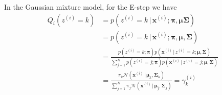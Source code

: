\documentclass[final,3p,times,twocolumn]{elsarticle}
\begin{document}
In the Gaussian mixture model, for the E-step we have
\begin{equation}
\label{eqn:gmmE}
\begin{split}
Q_i(z^{(i)} = k) &= p(z^{(i)} = k\,|\,\boldsymbol x^{(i)}; \boldsymbol \pi, \boldsymbol \mu \boldsymbol \Sigma)\\
&= p(z^{(i)}=k\,|\,\boldsymbol x^{(i)}; \boldsymbol \pi, \boldsymbol \mu, \boldsymbol \Sigma)\\
&= \frac{p(z^{(i)}=k;\boldsymbol \pi)p(\boldsymbol x^{(i)}\,|\,z^{(i)}=k;\boldsymbol \mu, \boldsymbol \Sigma)}
{\sum_{j=1}^K p(z^{(i)}=j;\boldsymbol \pi)p(\boldsymbol x^{(i)}\,|\,z^{(i)}=j;\boldsymbol \mu, \boldsymbol \Sigma)}\\
&= \frac{\pi_k\mathcal{N}(\boldsymbol x^{(i)}\,|\,\boldsymbol \mu_k, \boldsymbol \Sigma_k)}
{\sum_{j=1}^K \pi_j\mathcal{N}(\boldsymbol x^{(i)}\,|\,\boldsymbol \mu_j, \boldsymbol \Sigma_j)} = \gamma_k^{(i)}
\end{split}
\end{equation}
\end{document}
